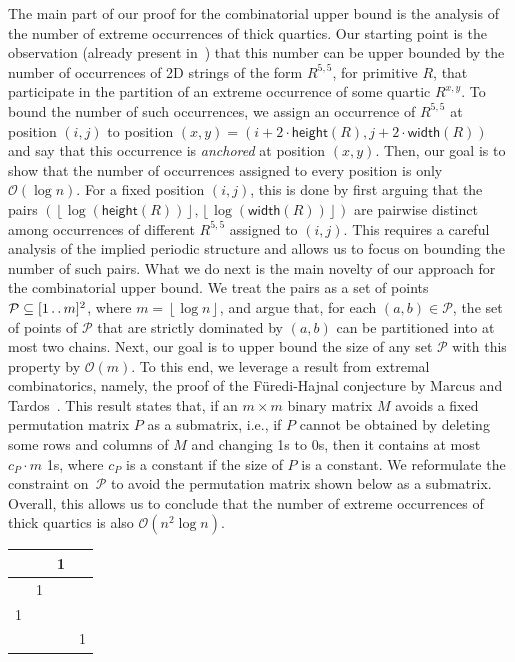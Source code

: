 \documentclass[11pt,letterpaper]{article}
\newcommand{\cO}{\mathcal{O}}
\newcommand{\floor}[1]{\left\lfloor #1 \right\rfloor}
\newcommand{\width}{\textsf{width}}
\newcommand{\height}{\textsf{height}}
\def\dd{\mathinner{.\,.}}
\renewcommand{\P}{\mathcal{P}}
\begin{document}
The main part of our proof for the combinatorial upper bound is the analysis of the number of extreme occurrences of thick quartics.
Our starting point is the observation (already present in~\cite{CRRWZ}) that this number can be upper bounded by the number of occurrences of 2D strings of the form $R^{5,5}$, for primitive $R$,
that participate in the partition of an extreme occurrence of some quartic $R^{x,y}$.
To bound the number of such occurrences, we assign an occurrence of $R^{5,5}$ at position $(i,j)$
to position $(x,y)=(i+2\cdot\height(R),j+2\cdot \width(R))$ and say that this occurrence is \emph{anchored} at position $(x,y)$. Then, our goal is to show that the number of occurrences
assigned to every position is only $\cO(\log n)$. For a fixed position $(i,j)$, this is done by first arguing that
the pairs $(\floor{\log (\height(R))}, \floor{\log (\width(R))})$ are pairwise distinct among occurrences
of different $R^{5,5}$ assigned to $(i,j)$. This requires a careful analysis of the implied periodic structure and allows us to focus on bounding the number of such pairs.
What we do next is the main novelty of our approach for the combinatorial upper bound.
We treat the pairs as a set of points $\P \subseteq [1\dd m]^{2}$, where $m=\floor{\log n}$, and argue that, 
for each $(a,b)\in \P$, the set of points of $\P$ that are strictly dominated by $(a,b)$ can be partitioned
into at most two chains. 
Next, our goal is to upper bound the size of any set $\P$ with this property by $\cO(m)$.
To this end, we leverage a result from extremal combinatorics, namely, the proof
of the Füredi-Hajnal conjecture by Marcus and Tardos~\cite{DBLP:journals/jct/MarcusT04}.
This result states that, if an $m\times m$ binary matrix $M$ avoids a fixed permutation matrix $P$ as a submatrix, i.e., if $P$ cannot be obtained by deleting some rows and columns of $M$ and changing 1s to 0s,
then it contains at most $c_P \cdot m$ 1s, where $c_P$ is a constant if the size of $P$ is a constant. We reformulate the constraint on~$\P$ to avoid
the permutation matrix shown below as a submatrix.
Overall, this allows us to conclude that the number
of extreme occurrences of thick quartics is also $\cO(n^{2}\log n)$.


\begin{center}
\begin{tabular}{ |c|c|c|c| } 
 \hline
 & &  1 & \\ 
 \hline
 & 1 &  & \\ 
 \hline
 1 & &  & \\ 
 \hline
 & &  & 1 \\ 
 \hline
\end{tabular}
\end{center}
\end{document}

